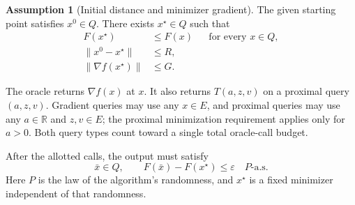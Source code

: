 \documentclass[10pt]{article}
\theoremstyle{definition}
\newtheorem{assumption}{Assumption}
\begin{document}
\begin{assumption}[Initial distance and minimizer gradient]
The given starting point satisfies $x^0\in Q$. There exists $x^\star\in Q$ such that
\[
\begin{aligned}
F(x^\star)&\leq F(x) &&\text{for every }x\in Q,\\
\|x^0-x^\star\|&\leq R,\\
\|\nabla f(x^\star)\|&\leq G.
\end{aligned}
\]
\end{assumption}

The oracle returns $\nabla f(x)$ at $x$. It also returns $T(a,z,v)$ on a proximal query $(a,z,v)$. Gradient queries may use any $x\in E$, and proximal queries may use any $a\in\mathbb{R}$ and $z,v\in E$; the proximal minimization requirement applies only for $a>0$. Both query types count toward a single total oracle-call budget.

After the allotted calls, the output must satisfy
\[
\bar{x}\in Q,
\qquad F(\bar{x})-F(x^\star)\leq\varepsilon
\quad P\text{-a.s.}
\]
Here $P$ is the law of the algorithm's randomness, and $x^\star$ is a fixed minimizer independent of that randomness.
\end{document}
